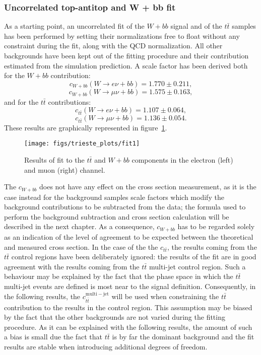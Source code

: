 \subsubsection{Uncorrelated top-antitop and W + bb fit}
As a starting point, an uncorrelated fit of the $W + bb$ signal and of the 
$t\bar{t}$ samples has been performed by setting their normalizations 
free to float without any constraint during the fit, along with the 
QCD normalization.
All other backgrounds have been kept out of the fitting procedure 
and their contribution estimated from the simulation prediction.
A scale factor has been derived both for the $W + bb$ contribution:
$$c_{W+bb}(W \rightarrow e \nu + bb) = 1.770 \pm 0.211 \mathrm{,}$$
$$c_{W+bb}(W \rightarrow \mu \nu + bb) = 1.575 \pm 0.163 \mathrm{,}$$
and for the $t\bar{t}$ contributions:
$$c_{t\bar{t}}(W \rightarrow e \nu + bb) = 1.107 \pm 0.064 \mathrm{,}$$
$$c_{t\bar{t}}(W \rightarrow \mu \nu + bb) = 1.136 \pm 0.054 \mathrm{.}$$
These results are graphically represented in figure~\ref{fig:unconstrainedfit}.
\begin{figure}[htb]
	\begin{center}
		\leavevmode
		\texttt{[image: figs/trieste\_plots/fit1]}
	\end{center}
	\caption{Results of fit to the $t\bar{t}$ and $W+bb$ components in the electron (left) and 
          muon (right) channel.}
	\label{fig:unconstrainedfit}
\end{figure}
The $c_{W+bb}$ does not have any effect on the cross section measurement, 
as it is the case instead for the background samples scale factors which 
modify the background contributions to be subtracted from the data;
the formula used to perform the background subtraction and cross section 
calculation will be described in the next chapter. 
As a consequence, $c_{W+bb}$ has to be regarded solely as an indication of the 
level of agreement to be expected between the theoretical and measured 
cross section.
In the case of the the $c_{t\bar{t}}$, the results coming from the 
$t\bar{t}$ control regions have been deliberately ignored: 
the results of the fit are in good agreement with the results coming from 
the $t\bar{t}$ multi-jet control region. Such a behaviour may be 
explained by the fact that the phase space in which the $t\bar{t}$ multi-jet 
events are defined is most near to the signal definition.
Consequently, in the following results, 
the $c_{t\bar{t}}^{\mathrm{multi-jet}}$ will be used when 
constraining the $t\bar{t}$ contribution to the results in the control 
region.
This assumption may be biased by the fact that the other backgrounds are 
not varied during the fitting procedure. As it can be explained with the following results, 
the amount of such a bias is small due the fact that $t\bar{t}$ is by 
far the dominant background and the fit results are stable when 
introducing additional degrees of freedom.

